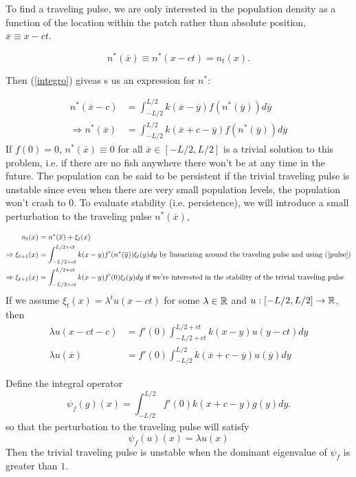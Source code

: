 \documentclass[]{article}
\begin{document}
To find a traveling pulse, we are only interested in the population density as a function of the location within the patch rather than absolute position, $\overline{x}\equiv x-ct$.

\begin{equation}n^*(\overline{x})\equiv n^*(x-ct)=n_t(x).   \label{trav} \end{equation}

Then (\ref{integro}) giveas s us an expression for $n^*$:

\begin{align*}
n^*(\overline{x}-c)&=\int_{-L/2}^{L/2}k(\overline{x}-\overline{y})f(n^*(\overline{y}))d\overline y 
\\ \Rightarrow n^*(\overline{x})&=\int_{-L/2}^{L/2}k(\overline{x}+c-\overline{y})f(n^*(\overline{y}))d\overline y \tag{*} \label{pulse}
\end{align*}
If $f(0)=0$, $n^*(\overline{x})\equiv 0$ for all $\overline{x}\in[-L/2,L/2]$ is a trivial solution to this problem, i.e. if there are no fish anywhere there won't be at any time in the future. The population can be said to be persistent if the trivial traveling pulse is unstable since even when there are very small population levels, the population won't crash to $0$.  To evaluate stability (i.e. persistence), we will introduce a small perturbation to the traveling pulse $n^*(\overline{x})$,

\begin{align*}
n_t(x)&=n^*(\overline{x})+\xi_t(x)
\\ \Rightarrow \xi_{t+1}(x)&=\int_{-L/2+ct}^{L/2+ct}k(x-y)f'(n^*(\overline{y}))\xi_t(y)dy \text{ by linearizing around the traveling pulse and using (\ref{pulse})}
\\ \Rightarrow \xi_{t+1}(x)&=\int_{-L/2+ct}^{L/2+ct}k(x-y)f'(0)\xi_t(y)dy \text{ if we're interested in the stability of the trivial traveling pulse}
\end{align*}
If we assume $\xi_t(x)=\lambda^tu(x-ct)$ for some $\lambda\in{\mathbb{R}}$ and $u:[-L/2,L/2]\to{\mathbb{R}}$, then 
\begin{align*}
\lambda u(x-ct-c)&=f'(0)\int_{-L/2+ct}^{L/2+ct}k(x-y)u(y-ct)dy
\\ \lambda u(\overline{x})&=f'(0)\int_{-L/2}^{L/2}k(\overline{x}+c-\overline{y})u(\overline{y})dy
\end{align*}

Define the integral operator
$$ \psi_f(g)(x)=\int_{-L/2}^{L/2}f'(0)k(x+c-y)g(y)dy. $$
so that the perturbation to the traveling pulse will satisfy 
\begin{equation} \psi_f(u)(x)=\lambda u(x) \label{eigen} \end{equation}
Then the trivial traveling pulse is unstable when the dominant eigenvalue of $\psi_f$ is greater than $1$.
\end{document}
